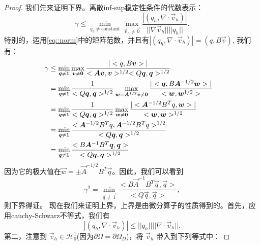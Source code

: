         \begin{proof}
            我们先来证明下界。离散inf-sup稳定性条件的代数表示：
            \begin{equation}
                \gamma \leq \min_{q_h \neq \mbox{constant}} \max_{\vec{v}_h \neq \vec{0}} \frac{|(q_h, \nabla \cdot \vec{v}_h)|}{||\nabla \vec{v}_h|| ||q_h||}.
            \end{equation}
            特别的，运用\eqref{eq::norm}中的矩阵范数，并且有$|(q_h, \nabla \cdot \vec{v}_h)| = (q, B\vec{v})$, 我们有：
            \begin{align}
                \gamma & \leq  \min_{\vec{q} \neq \vec{1}} \max_{\vec{v} \neq \vec{0}} \frac{|<q, B\vec{v}>|}{<\vec{A}\vec{v}, \vec{v}>^{1/2} <Q\vec{q}, \vec{q}>^{1/2}} &\\  \notag
                & =  \min_{\vec{q} \neq \vec{1}} \frac{1}{<Q\vec{q}, \vec{q}>^{1/2}} \max_{\vec{w} = \vec{A}^{1/2}\vec{v} \neq \vec{0}} \frac{|<\vec{q}, B \vec{A}^{-1/2} \vec{w}>|}{<\vec{w}, \vec{w}^{1/2}>} &\\ \notag
                & =  \min_{\vec{q} \neq \vec{1}} \frac{1}{<Q\vec{q}, \vec{q}>^{1/2}} \max_{\vec{w} \neq \vec{0}} \frac{|<\vec{A}^{-1/2}B^Tq, \vec{w}>|}{<\vec{w}, \vec{w}>^{1/2}} &\\ \notag
                & =  \min_{\vec{q} \neq \vec{1}} \frac{<\vec{A}^{-1/2}B^Tq, \vec{A}^{-1/2}B^Tq>^{1/2}}{<Q\vec{q}, \vec{q}>^{1/2}} &\\ \notag
                & = \min_{\vec{q} \neq \vec{1}} \frac{<B \vec{A}^{-1}B^T\vec{q}, \vec{q}>}{<Q\vec{q}, \vec{q}>^{1/2}}& \notag
            \end{align}
            因为它的极大值在$\vec{w} = \pm \vec{A}^{-1/2}B^T \vec{q}$。因此，我们可以看到
            \begin{equation}
                \gamma^2 = \min_{\vec{q} \neq \vec{1}} \frac{<B\vec{A}^{-1}B^T \vec{q}, \vec{q}>}{<Q\vec{q}, \vec{q}>},
                \label{eq::lower_bound}
            \end{equation}
            则下界得证。
            现在我们来证明上界，上界是由微分算子的性质得到的。首先，应用cauchy-Schwarz不等式，我们有
            \begin{equation}
                |(q_h, \nabla \cdot \vec{v}_h)| \leq ||q_h|| ||\nabla \cdot \vec{v}_h||.
                \label{eq::cauchy_schwarz_inequality}
            \end{equation}
            第二，注意到 $\vec{v}_h \in \mathcal{H}_0^1$(因为$\partial \Omega  = \partial \Omega_D$)，将 $\vec{v}_h$ 带入到下列等式中：

\end{proof}
